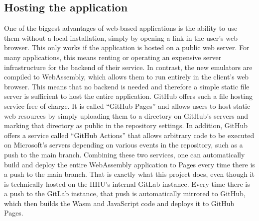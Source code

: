 \subsection{Hosting the application}
One of the biggest advantages of web-based applications is the ability to use them without a local installation, simply by opening a link in the user's web browser.
This only works if the application is hosted on a public web server.
For many applications, this means renting or operating an expensive server infrastructure for the backend of their service.
In contrast, the new emulators are compiled to WebAssembly, which allows them to run entirely in the client's web browser.
This means that no backend is needed and therefore a simple static file server is sufficient to host the entire application.
GitHub offers such a file hosting service free of charge.
It is called ``GitHub Pages'' and allows users to host static web resources by simply uploading them to a directory on GitHub's servers and marking that directory as public in the repository settings.
In addition, GitHub offers a service called ``GitHub Actions'' that allows arbitrary code to be executed on Microsoft's servers depending on various events in the repository, such as a push to the main branch.
Combining these two services, one can automatically build and deploy the entire WebAssembly application to Pages every time there is a push to the main branch.
That is exactly what this project does, even though it is technically hosted on the HHU's internal GitLab instance.
Every time there is a push to the GitLab instance, that push is automatically mirrored to GitHub, which then builds the Wasm and JavaScript code and deploys it to GitHub Pages.
